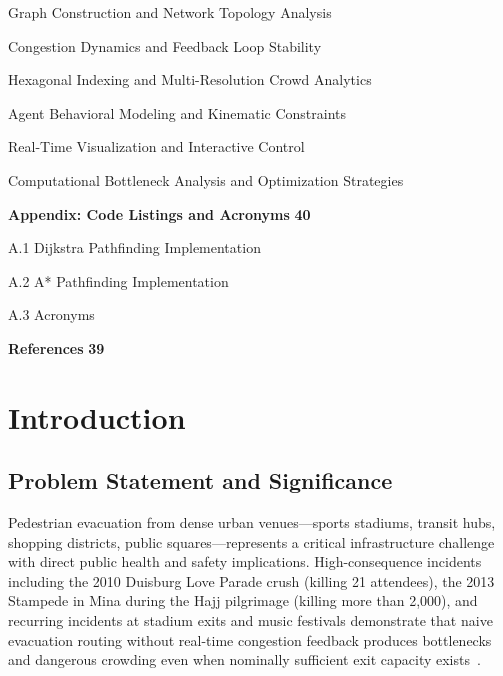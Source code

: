 \documentclass[12pt,a4paper,oneside]{report}
\begin{document}
\noindent{} \quad Graph Construction and Network Topology Analysis 

\noindent{} \quad Congestion Dynamics and Feedback Loop Stability 

\noindent{} \quad Hexagonal Indexing and Multi-Resolution Crowd Analytics 

\noindent{} \quad Agent Behavioral Modeling and Kinematic Constraints 

\noindent{} \quad Real-Time Visualization and Interactive Control 

\noindent{} \quad Computational Bottleneck Analysis and Optimization Strategies 

\vspace{0.4cm}
\noindent\textbf{Appendix: Code Listings and Acronyms} \dotfill \textbf{40}

\noindent\quad A.1 \quad Dijkstra Pathfinding Implementation 

\noindent\quad A.2 \quad A* Pathfinding Implementation 

\noindent\quad A.3 \quad Acronyms 

\vspace{0.4cm}
\noindent\textbf{References} \dotfill \textbf{39}

\clearpage
\newpage
{}
\setcounter{page}{1}

\chapter{Introduction}

\section{Problem Statement and Significance}
Pedestrian evacuation from dense urban venues—sports stadiums, transit hubs, shopping districts, public squares—represents a critical infrastructure challenge with direct public health and safety implications. High-consequence incidents including the 2010 Duisburg Love Parade crush (killing 21 attendees), the 2013 Stampede in Mina during the Hajj pilgrimage (killing more than 2,000), and recurring incidents at stadium exits and music festivals demonstrate that naive evacuation routing without real-time congestion feedback produces bottlenecks and dangerous crowding even when nominally sufficient exit capacity exists~\cite{helbing2000simulating}. 
\end{document}
